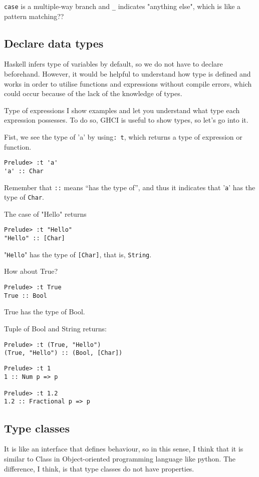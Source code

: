 \lstinline{case} is a multiple-way branch and \lstinline{_} indicates "anything else", which is like a pattern matching??

\subsection{Declare data types}
Haskell infers type of variables by default, so we do not have to declare beforehand. 
However, it would be helpful to understand how type is defined and works in order to utilise functions and expressions without compile errors, which could occur because of the lack of the knowledge of types.

Type of expressions
I show examples and let you understand what type each expression possesses. To do so, GHCI is useful to show types, so let’s go into it.

Fist, we see the type of 'a' by using\lstinline{: t}, which returns a type of expression or function. 
\begin{lstlisting}
Prelude> :t 'a'
'a' :: Char
\end{lstlisting}

Remember that \lstinline{::} means “has the type of”, and thus it indicates that '\lstinline{a}' has the type of \lstinline{Char}.

The case of "Hello" returns
\begin{lstlisting}
Prelude> :t "Hello"
"Hello" :: [Char]
\end{lstlisting}

"\lstinline{Hello}" has the type of \lstinline{[Char]}, that is, \lstinline{String}.

How about True?
\begin{lstlisting}
Prelude> :t True
True :: Bool
\end{lstlisting}
True has the type of Bool.

Tuple of Bool and String returns:
\begin{lstlisting}
Prelude> :t (True, "Hello")
(True, "Hello") :: (Bool, [Char])
\end{lstlisting}

\begin{lstlisting}
Prelude> :t 1
1 :: Num p => p

Prelude> :t 1.2
1.2 :: Fractional p => p
\end{lstlisting}

\subsection{Type classes}
It is like an interface that defines behaviour, so in this sense, I think that it is similar to Class in Object-oriented programming language like python. The difference, I think, is that type classes do not have properties. 

